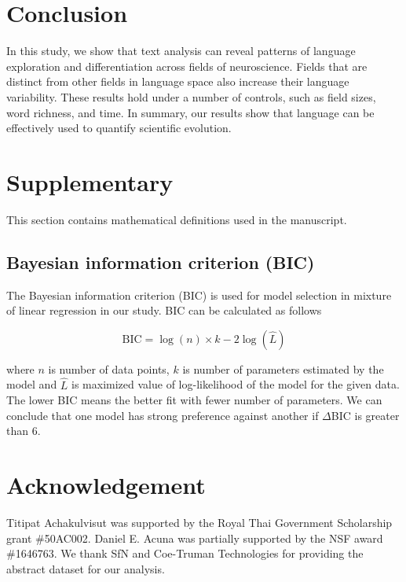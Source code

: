 \documentclass[10pt,letterpaper]{article}
\begin{document}
\section*{Conclusion}

In this study, we show that text analysis can reveal patterns of language exploration and differentiation across fields of neuroscience. Fields that are distinct from other fields in language space also increase their language variability. These results hold under a number of controls, such as field sizes, word richness, and time. In summary, our results show that language can be effectively used to quantify scientific evolution.


\section*{Supplementary}

This section contains mathematical definitions used in the manuscript.

\subsection*{Bayesian information criterion (BIC)}

The Bayesian information criterion (BIC) \cite{schwarz1978estimating} is used for model selection in mixture of linear regression in our study. BIC can be calculated as follows

\begin{equation}
    \text{BIC} = \log (n) \times k - 2 \log (\hat{L})
\end{equation}

where $n$ is number of data points, $k$ is number of parameters estimated by the model and $\hat{L}$ is maximized value of log-likelihood of the model for the given data. The lower BIC means the better fit with fewer number of parameters. We can conclude that one model has strong preference against another if $\Delta$BIC is greater than 6.


\section*{Acknowledgement}

Titipat Achakulvisut was supported by the Royal Thai Government Scholarship grant \#50AC002. Daniel E. Acuna was partially supported by the NSF award \#1646763. We thank SfN and Coe-Truman Technologies for providing the abstract dataset for our analysis.

\nolinenumbers



\end{document}
